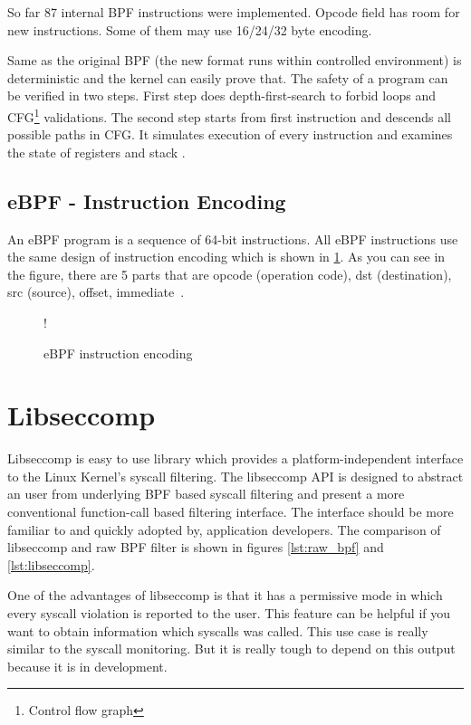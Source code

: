 So far 87 internal BPF instructions were implemented. Opcode field has room for new instructions. Some of them may use 16/24/32 byte encoding.

Same as the original BPF (the new format runs within controlled environment) is deterministic and the kernel can easily prove that.
The safety of a program can be verified in two steps.
First step does depth-first-search to forbid  loops and CFG\footnote{Control flow graph} validations.
The second step starts from first instruction and descends all possible paths in CFG. It simulates execution of every instruction and examines the state of registers and stack \cite{kernel_bpf_specification}.

\subsection{eBPF - Instruction Encoding}
An eBPF program is a sequence of 64-bit instructions.
All eBPF instructions use the same design of instruction encoding which is shown in \ref{fig:tikz:eBPF_instruction}.
As you can see in the figure, there are 5 parts that are opcode (operation code), dst (destination), src (source), offset, immediate~\cite{kernel_bpf_specification}.

\begin{figure}[h]
  \centering
  \resizebox {\textwidth} {!} {
    
  }
  \caption{eBPF instruction encoding}
  \label{fig:tikz:eBPF_instruction}
\end{figure}

\section{Libseccomp}
Libseccomp\cite{libseccomp_git} is easy to use library which provides a platform-independent interface to the Linux Kernel's syscall filtering.
The libseccomp API is designed to abstract an user from underlying BPF based syscall filtering and present a more conventional function-call based filtering interface.
The interface should be more familiar to and quickly adopted by, application developers.
The comparison of libseccomp and raw BPF filter is shown in figures \ref{lst:raw_bpf} and \ref{lst:libseccomp}.

One of the advantages of libseccomp is that it has a permissive mode in which every syscall violation is reported to the user.
This feature can be helpful if you want to obtain information which syscalls was called.
This use case is really similar to the syscall monitoring.
But it is really tough to depend on this output because it is in development.


